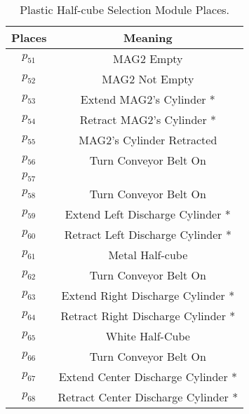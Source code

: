 \begin{table}[htbp]
\caption{Plastic Half-cube Selection Module Places.}
\centering
\begin{tabular}{cc}
Places & Meaning\\
\hline
\hyperlink{partialNet:p51}{\hypertarget{partialTable:p51}{$p_{51}$}} & MAG2 Empty\\
\hyperlink{partialNet:p52}{\hypertarget{partialTable:p52}{$p_{52}$}} & MAG2 Not Empty\\
\hyperlink{partialNet:p53}{\hypertarget{partialTable:p53}{$p_{53}$}} & Extend MAG2's Cylinder *\\
\hyperlink{partialNet:p54}{\hypertarget{partialTable:p54}{$p_{54}$}} & Retract MAG2's Cylinder *\\
\hyperlink{partialNet:p55}{\hypertarget{partialTable:p55}{$p_{55}$}} & MAG2's Cylinder Retracted\\
\hyperlink{partialNet:p56}{\hypertarget{partialTable:p56}{$p_{56}$}} & Turn Conveyor Belt On\\
\hyperlink{partialNet:p57}{\hypertarget{partialTable:p57}{$p_{57}$}} & \\
\hyperlink{partialNet:p58}{\hypertarget{partialTable:p58}{$p_{58}$}} & Turn Conveyor Belt On\\
\hyperlink{partialNet:p59}{\hypertarget{partialTable:p59}{$p_{59}$}} & Extend Left Discharge Cylinder *\\
\hyperlink{partialNet:p60}{\hypertarget{partialTable:p60}{$p_{60}$}} & Retract Left Discharge Cylinder *\\
\hyperlink{partialNet:p61}{\hypertarget{partialTable:p61}{$p_{61}$}} & Metal Half-cube\\
\hyperlink{partialNet:p62}{\hypertarget{partialTable:p62}{$p_{62}$}} & Turn Conveyor Belt On\\
\hyperlink{partialNet:p63}{\hypertarget{partialTable:p63}{$p_{63}$}} & Extend Right Discharge Cylinder *\\
\hyperlink{partialNet:p64}{\hypertarget{partialTable:p64}{$p_{64}$}} & Retract Right Discharge Cylinder *\\
\hyperlink{partialNet:p65}{\hypertarget{partialTable:p65}{$p_{65}$}} & White Half-Cube\\
\hyperlink{partialNet:p66}{\hypertarget{partialTable:p66}{$p_{66}$}} & Turn Conveyor Belt On\\
\hyperlink{partialNet:p67}{\hypertarget{partialTable:p67}{$p_{67}$}} & Extend Center Discharge Cylinder *\\
\hyperlink{partialNet:p68}{\hypertarget{partialTable:p68}{$p_{68}$}} & Retract Center Discharge Cylinder *\\

\end{tabular}
\end{table}
